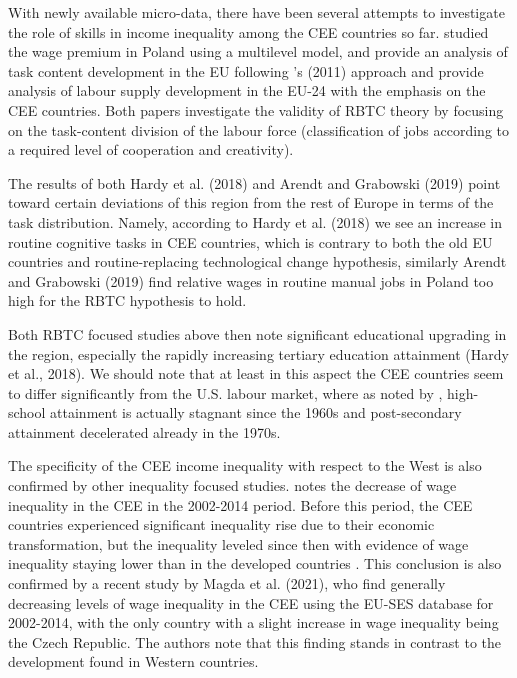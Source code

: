 \documentclass[11pt]{article}
\begin{document}
With newly available micro-data, there have been several attempts to investigate the role of skills in income inequality among the CEE countries so far. \citet{arendt2019technical} studied the wage premium in Poland using a multilevel model, and \citet{hardy2018educational} provide an analysis of task content development in the EU following \citeauthor{acemoglu2011skills}'s (2011) approach and provide analysis of labour supply development in the EU-24 with the emphasis on the CEE countries. Both papers investigate the validity of RBTC theory by focusing on the task-content division of the labour force (classification of jobs according to a required level of cooperation and creativity).

The results of both Hardy et al. (2018) and Arendt and Grabowski (2019) point toward certain deviations of this region from the rest of Europe in terms of the task distribution. Namely, according to Hardy et al. (2018) we see an increase in routine cognitive tasks in CEE countries, which is contrary to both the old EU countries and routine-replacing technological change hypothesis, similarly Arendt and Grabowski (2019) find relative wages in routine manual jobs in Poland too high for the RBTC hypothesis to hold. 

Both  RBTC focused studies above then note significant educational upgrading in the region, especially the rapidly increasing tertiary education attainment (Hardy et al., 2018). We should note that at least in this aspect the CEE countries seem to differ significantly from the U.S. labour market, where as noted by \citet{acemoglu2012does}, high-school attainment is actually stagnant since the 1960s and post-secondary attainment decelerated already in the 1970s.

The specificity of the CEE income inequality with respect to the West is also confirmed by  other inequality focused studies. \citet{magda2021firms} notes the decrease of wage inequality in the CEE in the 2002-2014 period. Before this period, the CEE countries experienced significant inequality rise due to their economic transformation, but the inequality leveled since then \citep{tyrowicz2019wage} with evidence of wage inequality staying lower than in the developed countries \citep{mysikova2018personal}. This conclusion is also confirmed by a recent study by Magda et al. (2021), who find generally decreasing levels of wage inequality in the CEE using the EU-SES database for 2002-2014, with the only country with a slight increase in wage inequality being the Czech Republic. The authors note that this finding stands in contrast to the development found in Western countries.%
\end{document}
